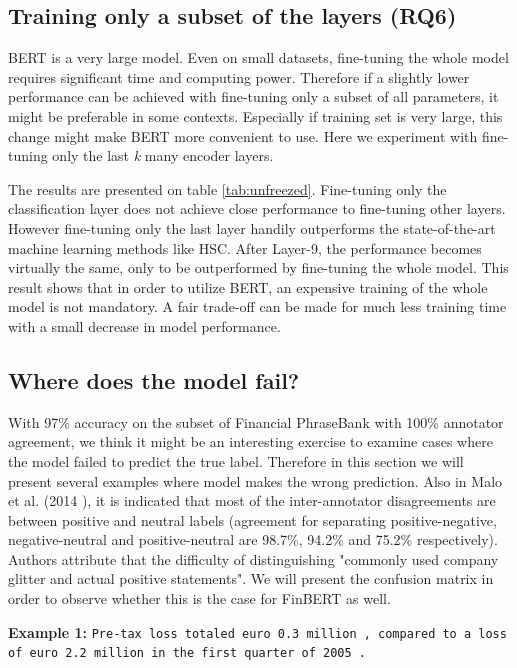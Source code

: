\documentclass[../main.tex]{subfiles}
\begin{document}
    
\subsection{Training only a subset of the layers (RQ6)}
BERT is a very large model. Even on small datasets, fine-tuning the whole model requires significant time and computing power. Therefore if a slightly lower performance can be achieved with fine-tuning only a subset of all parameters, it might be preferable in some contexts. Especially if training set is very large, this change might make BERT more convenient to use. Here we experiment with fine-tuning only the last \textit{k} many encoder layers.

    

The results are presented on table \ref{tab:unfreezed}. Fine-tuning only the classification layer does not achieve close performance to fine-tuning other layers. However fine-tuning only the last layer handily outperforms the state-of-the-art machine learning methods like HSC. After Layer-9, the performance becomes virtually the same, only to be outperformed by fine-tuning the whole model. This result shows that in order to utilize BERT, an expensive training of the whole model is not mandatory. A fair trade-off can be made for much less training time with a small decrease in model performance. 

\subsection{Where does the model fail?}
With 97\% accuracy on the subset of Financial PhraseBank with 100\% annotator agreement, we think it might be an interesting exercise to examine cases where the model failed to predict the true label. Therefore in this section we will present several examples where model makes the wrong prediction. Also in Malo et al. (2014 )\cite{Malo2014}, it is indicated that most of the inter-annotator disagreements are between positive and neutral labels (agreement for separating positive-negative, negative-neutral and positive-neutral are 98.7\%, 94.2\% and 75.2\% respectively). Authors attribute that the difficulty of distinguishing "commonly used company glitter and actual positive statements". We will present the confusion matrix in order to observe whether this is the case for FinBERT as well. 
\newline

\textbf{Example 1:} \texttt{Pre-tax loss totaled euro 0.3 million , compared to a loss of euro 2.2 million in the first quarter of 2005 .
}
\end{document}
